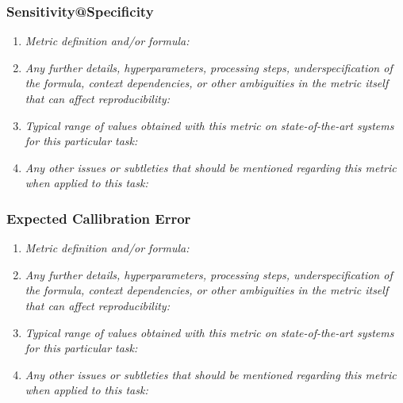 \documentclass[a4paper,11pt]{article}
\begin{document}
        \subsubsection{Sensitivity@Specificity}
            \begin{enumerate}[label=\alph*.]
                \item \textit{Metric definition and/or formula:}
                \bigskip
                \item \textit{Any further details, hyperparameters, processing steps, underspecification of the formula, context dependencies, or other ambiguities in the metric itself that can affect reproducibility:}
                \bigskip
                \item \textit{Typical range of values obtained with this metric on state-of-the-art systems for this particular task:}
                \bigskip
                \item \textit{Any other issues or subtleties that should be mentioned regarding this metric when applied to this task:}
                \bigskip
            \end{enumerate}
        \subsubsection{Expected Callibration Error}
            \begin{enumerate}[label=\alph*.]
                \item \textit{Metric definition and/or formula:}
                \bigskip
                \item \textit{Any further details, hyperparameters, processing steps, underspecification of the formula, context dependencies, or other ambiguities in the metric itself that can affect reproducibility:}
                \bigskip
                \item \textit{Typical range of values obtained with this metric on state-of-the-art systems for this particular task:}
                \bigskip
                \item \textit{Any other issues or subtleties that should be mentioned regarding this metric when applied to this task:}
                \bigskip
            \end{enumerate}
\end{document}
